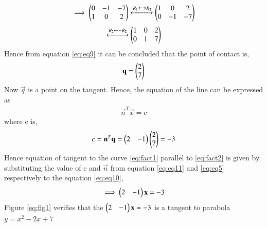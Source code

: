 \documentclass[journal,12pt,twocolumn]{IEEEtran}
\begin{document}
\begin{enumerate}
\begin{align}
			\implies \begin{pmatrix}0&-1&-7\\1&0&2\end{pmatrix} \xleftrightarrow[]{R_1\xleftrightarrow[]{}R_2} \begin{pmatrix}1&0&2\\0&-1&-7\end{pmatrix}
		\end{align}
		\begin{align}
			\xleftrightarrow[]{R_2\leftarrow  -R_2} \begin{pmatrix}1&0&2\\0&1&7\end{pmatrix}
			\label{eq:eq9}
		\end{align}
		Hence from equation \eqref{eq:eq9} it can be concluded that the point of contact is,
		\begin{align}
			\mathbf{q} = \begin{pmatrix}2\\7\end{pmatrix}
		\end{align}
		Now $\vec{q}$ is a point on the tangent. Hence, the equation of the
		line can be expressed as
		\begin{align}
			\vec{n}^T\vec{x} = c
			\label{eq:eq10}
		\end{align}
		where c is,
		\begin{align}
			c = \mathbf{n}^T\mathbf{q} = \begin{pmatrix}2&-1\end{pmatrix}\begin{pmatrix}2\\7\end{pmatrix} = -3 
			\label{eq:eq11}
		\end{align}
		Hence equation of tangent to the curve \eqref{eq:fact1} parallel to \eqref{eq:fact2} is given by substituting the value of c and $\vec{n}$ from equation \eqref{eq:eq11} and \eqref{eq:eq5} respectively to the equation \eqref{eq:eq10},
		\begin{align}
			\implies\begin{pmatrix}2&-1\end{pmatrix}\mathbf{x} = -3 
		\end{align}
		Figure \ref{eq:fig1} verifies that the $\begin{pmatrix}2&-1\end{pmatrix}\mathbf{x} = -3$ is a tangent to parabola  $y = x^2-2x+7$ \\\\
	

\end{enumerate}
\end{document}
